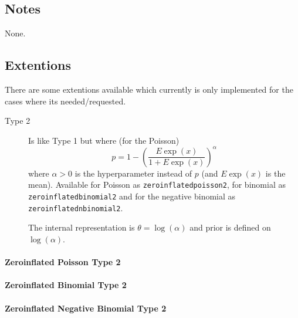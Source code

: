 \documentclass[a4paper,11pt]{article}
\begin{document}


\subsection*{Notes}

None.

\subsection*{Extentions}

There are some extentions available which currently is only
implemented for the cases where its needed/requested.
\begin{description}
\item[Type 2] Is like Type 1 but where (for the Poisson)
    \begin{displaymath}
        p = 1-\left( \frac{E\exp(x)}{1 + E\exp(x)}\right)^{\alpha}
    \end{displaymath}
    where $\alpha > 0$ is the hyperparameter instead of $p$ (and
    $E\exp(x)$ is the mean).  Available for Poisson as
    \texttt{zeroinflatedpoisson2}, for binomial as
    \texttt{zeroinflatedbinomial2} and for the negative binomial as
    \texttt{zeroinflatednbinomial2}.

    The internal representation is $\theta = \log(\alpha)$ and prior
    is defined on $\log(\alpha)$.
\end{description}

\paragraph{Zeroinflated Poisson Type 2}


\paragraph{Zeroinflated Binomial Type 2}


\paragraph{Zeroinflated Negative Binomial Type 2}

\end{document}
